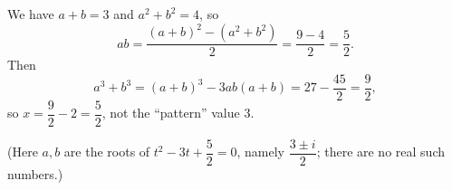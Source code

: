 We have $a+b=3$ and $a^2+b^2=4$, so
\[ab=\dfrac{(a+b)^2-\left(a^2+b^2\right)}2=\dfrac{9-4}2=\dfrac52.\]
Then
\[a^3+b^3=(a+b)^3-3ab(a+b)=27-\dfrac{45}2=\dfrac92,\]
so $x=\dfrac92-2=\boxed{\dfrac52}$, not the ``pattern'' value $3$.

(Here $a,b$ are the roots of $t^2-3t+\dfrac52=0$, namely $\dfrac{3\pm i}2$; there are no real such numbers.)
